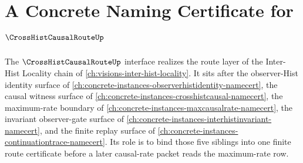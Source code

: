\chapter{A Concrete Naming Certificate for $\CrossHistCausalRouteUp$}
\label{ch:concrete-instances-crosshistcausalroute-namecert}

The $\CrossHistCausalRouteUp$ interface realizes the route layer of the Inter-Hist Locality chain of \autoref{ch:visions-inter-hist-locality}. It sits after the observer-Hist identity surface of \autoref{ch:concrete-instances-observerhistidentity-namecert}, the causal witness surface of \autoref{ch:concrete-instances-crosshistcausal-namecert}, the maximum-rate boundary of \autoref{ch:concrete-instances-maxcausalrate-namecert}, the invariant observer-gate surface of \autoref{ch:concrete-instances-interhistinvariant-namecert}, and the finite replay surface of \autoref{ch:concrete-instances-continuationtrace-namecert}. Its role is to bind those five siblings into one finite route certificate before a later causal-rate packet reads the maximum-rate row.

